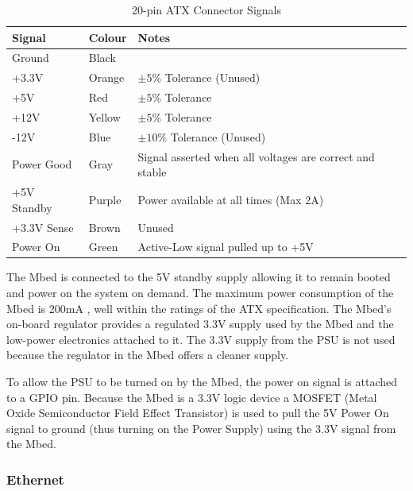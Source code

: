 				\begin{table}[here]
					\centering
					\begin{tabular}{l l l}
						\toprule
						Signal & Colour & Notes\\
						\midrule
						Ground & Black  & \\
						+3.3V  & Orange & $\pm5\%$  Tolerance (Unused) \\
						+5V    & Red    & $\pm5\%$  Tolerance \\
						+12V   & Yellow & $\pm5\%$  Tolerance \\
						-12V   & Blue   & $\pm10\%$ Tolerance (Unused) \\
						\addlinespace
						Power Good  & Gray   & Signal asserted when all voltages are correct
						                       and stable \\
						+5V Standby & Purple & Power available at all times (Max 2A) \\
						+3.3V Sense & Brown  & Unused \\
						Power On    & Green  & Active-Low signal pulled up to +5V \\
						
						\bottomrule
					\end{tabular}
					
					\caption{20-pin ATX Connector Signals\cite{ATX}}
					\label{tab:atxConnectors}
				\end{table}
				
				The Mbed is connected to the 5V standby supply allowing it to remain
				booted and power on the system on demand. The maximum power consumption
				of the Mbed is 200mA \cite{mbed}, well within the ratings of the ATX
				specification. The Mbed's on-board regulator provides a regulated 3.3V
				supply used by the Mbed and the low-power electronics attached to it.
				The 3.3V supply from the PSU is not used because the regulator in the
				Mbed offers a cleaner supply.
				
				To allow the PSU to be turned on by the Mbed, the power on signal is
				attached to a GPIO pin.  Because the Mbed is a 3.3V logic device a
				MOSFET (Metal Oxide Semiconductor Field Effect Transistor) is used to
				pull the 5V Power On signal to ground (thus turning on the Power Supply)
				using the 3.3V signal from the Mbed.
		
			\subsubsection{Ethernet}
	
